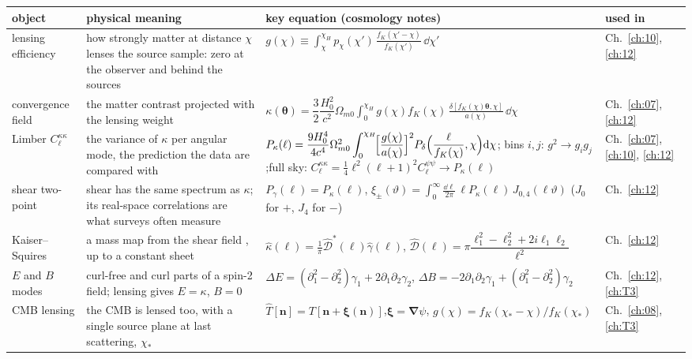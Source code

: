 \begin{center}
\small
\renewcommand{\arraystretch}{1.3}
\begin{tabularx}{\linewidth}{@{}>{\raggedright\arraybackslash}p{2.0cm}
                               >{\raggedright\arraybackslash}X
                               >{\raggedright\arraybackslash}p{6.8cm}
                               >{\raggedright\arraybackslash}p{1.35cm}@{}}
\toprule
object & physical meaning & key equation (cosmology notes) & used in\\\midrule
lensing efficiency & how strongly matter at distance $\chi$ lenses the source sample: zero at the observer and behind the sources &
$g(\chi)\equiv\displaystyle\int_\chi^{\chi_H}\!p_\chi(\chi')\,\frac{f_K(\chi'-\chi)}{f_K(\chi')}\,\dd\chi'$ &
Ch.~\ref{ch:10}, \ref{ch:12}\\
convergence field & the matter contrast projected with the lensing weight &
$\kappa(\bm\theta)=\dfrac32\dfrac{H_0^2}{c^2}\Omega_{m0}\displaystyle\int_0^{\chi_H}\!g(\chi)f_K(\chi)\,\frac{\delta[f_K(\chi)\bm\theta,\chi]}{a(\chi)}\,\dd\chi$ &
Ch.~\ref{ch:07}, \ref{ch:12}\\
Limber $C_\ell^{\kappa\kappa}$ & the variance of $\kappa$ per angular mode, the prediction the data are compared with &
$P_\kappa(\ell)=\dfrac{9H_0^4}{4c^4}\Omega_{m0}^2\displaystyle\int_0^{\chi_H}\!\Bigl[\frac{g(\chi)}{a(\chi)}\Bigr]^2P_\delta\Bigl(\frac{\ell}{f_K(\chi)},\chi\Bigr)\mathrm{d}\chi$;\newline
bins $i,j$: $g^2\to g_ig_j$;\quad full sky: $C_\ell^{\kappa\kappa}=\tfrac14\ell^2(\ell+1)^2C_\ell^{\psi\psi}\to P_\kappa(\ell)$ &
Ch.~\ref{ch:07}, \ref{ch:10}, \ref{ch:12}\\
shear two-point & shear has the same spectrum as $\kappa$; its real-space correlations are what surveys often measure &
$P_\gamma(\ell)=P_\kappa(\ell)$,\newline
$\xi_\pm(\vartheta)=\displaystyle\int_0^\infty\frac{\dd\ell}{2\pi}\,\ell P_\kappa(\ell)\,J_{0,4}(\ell\vartheta)$ ($J_0$ for $+$, $J_4$ for $-$) &
Ch.~\ref{ch:12}\\
Kaiser--Squires & a mass map from the shear field \cite{KaiserSquires1993}, up to a constant sheet &
$\hat\kappa(\bm\ell)=\tfrac1\pi\hat{\mathcal D}^*(\bm\ell)\hat\gamma(\bm\ell)$,\quad
$\hat{\mathcal D}(\bm\ell)=\pi\dfrac{\ell_1^2-\ell_2^2+2i\ell_1\ell_2}{\ell^2}$ &
Ch.~\ref{ch:12}\\
$E$ and $B$ modes & curl-free and curl parts of a spin-2 field; lensing gives $E=\kappa$, $B=0$ &
$\Delta E=(\partial_1^2-\partial_2^2)\gamma_1+2\partial_1\partial_2\gamma_2$,\newline
$\Delta B=-2\partial_1\partial_2\gamma_1+(\partial_1^2-\partial_2^2)\gamma_2$ &
Ch.~\ref{ch:12}, \ref{ch:T3}\\
CMB lensing & the CMB is lensed too, with a single source plane at last scattering, $\chi_*$ &
$\hat T[\bm n]=T[\bm n+\bm\xi(\bm n)]$,\quad $\bm\xi=\bm\nabla\psi$,\newline
$g(\chi)=f_K(\chi_*-\chi)/f_K(\chi_*)$ &
Ch.~\ref{ch:08}, \ref{ch:T3}\\
\bottomrule
\end{tabularx}
\end{center}

